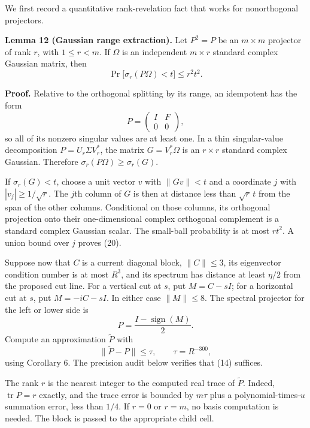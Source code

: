 \documentclass[10pt,a4paper]{article}
\begin{document}
We first record a quantitative rank-revelation fact that works for
nonorthogonal projectors.

\textbf{Lemma 12 (Gaussian range extraction).} Let \(P^2=P\) be an
\(m\times m\) projector of rank \(r\), with \(1\le r<m\). If \(\Omega\)
is an independent \(m\times r\) standard complex Gaussian matrix, then
\[
 \Pr\bigl[\sigma_r(P\Omega)<t\bigr]\le r^2t^2.
 \tag{20}
\]

\textbf{Proof.} Relative to the orthogonal splitting by its range, an
idempotent has the form \[
 P=\begin{pmatrix}I&F\\0&0\end{pmatrix},
\] so all of its nonzero singular values are at least one. In a thin
singular-value decomposition \(P=U_r\Sigma V_r^*\), the matrix
\(G=V_r^*\Omega\) is an \(r\times r\) standard complex Gaussian.
Therefore \(\sigma_r(P\Omega)\ge\sigma_r(G)\).

If \(\sigma_r(G)<t\), choose a unit vector \(v\) with \(\|Gv\|<t\) and a
coordinate \(j\) with \(|v_j|\ge1/\sqrt r\). The \(j\)th column of \(G\)
is then at distance less than \(\sqrt r\,t\) from the span of the other
columns. Conditional on those columns, its orthogonal projection onto
their one-dimensional complex orthogonal complement is a standard
complex Gaussian scalar. The small-ball probability is at most \(rt^2\).
A union bound over \(j\) proves (20).

Suppose now that \(C\) is a current diagonal block, \(\|C\|\le3\), its
eigenvector condition number is at most \(R^3\), and its spectrum has
distance at least \(\eta/2\) from the proposed cut line. For a vertical
cut at \(s\), put \(M=C-sI\); for a horizontal cut at \(s\), put
\(M=-iC-sI\). In either case \(\|M\|\le8\). The spectral projector for
the left or lower side is \[
 P=\frac{I-\operatorname{sign}(M)}2.
 \tag{21}
\] Compute an approximation \(\widetilde P\) with \[
 \|\widetilde P-P\|\le\tau,
 \qquad\tau=R^{-300},
 \tag{22}
\] using Corollary 6. The precision audit below verifies that (14)
suffices.

The rank \(r\) is the nearest integer to the computed real trace of
\(\widetilde P\). Indeed, \(\operatorname{tr}P=r\) exactly, and the
trace error is bounded by \(m\tau\) plus a polynomial-times-\(u\)
summation error, less than \(1/4\). If \(r=0\) or \(r=m\), no basis
computation is needed. The block is passed to the appropriate child
cell.
\end{document}
